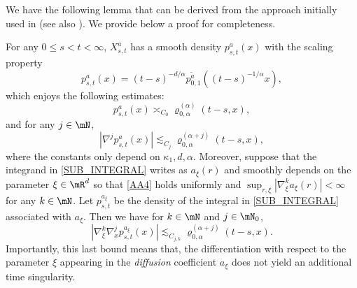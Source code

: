 We have the following lemma that can be derived from the approach initially used in \cite{Be} (see also
\cite{Bo-Ja}).
We provide below a proof for completeness.
\begin{lemma}\label{Le27}
For any $0\leq s<t<\infty$, $X^a_{s,t}$ has a smooth density $p_{s,t}^{a}(x)$ with the scaling property
\begin{equation}\label{SC0}
p_{s,t}^{a}(x)=(t-s)^{-d/\alpha} p_{0,1}^{\tilde a}((t-s)^{-1/\alpha}x),
\end{equation}
which enjoys the following estimates:
\begin{equation}
p_{s,t}^{a}(x)\asymp_{C_0}\varrho^{(\alpha)}_{0,\alpha}(t-s,x),\label{Es0}
\end{equation}
and for any $j\in\mN$,
\begin{equation}
|\nabla^j p_{s,t}^{a}(x)|\lesssim_{C_j}\varrho^{(\alpha+j)}_{0,\alpha}(t-s,x),\label{Es2}
\end{equation}
where the constants only depend on $\kappa_1,d,\alpha$. Moreover, suppose that the integrand in \eqref{SUB_INTEGRAL} writes as $a_\xi(r)$ and smoothly depends on the parameter $\xi\in\mR^d$ so that \eqref{AA4} holds uniformly and
$\sup_{r,\xi}|\nabla^k_\xi a_\xi(r)|<\infty$ for any $k\in\mN$.
Let $p_{s,t}^{a_\xi}$ be the density of the integral in \eqref{SUB_INTEGRAL} associated with $a_\xi$. Then we have
for $k\in\mN$ and $j\in\mN_0$,
\begin{equation}
|\nabla^k_\xi\nabla^j_x p_{s,t}^{a_\xi}(x)|\lesssim_{C_{j,k}} \varrho^{(\alpha+j)}_{0,\alpha}(t-s,x).\label{Es22}
\end{equation}
Importantly, this last bound means that, the differentiation with respect to the parameter $\xi $ appearing in the \textit{diffusion} coefficient $a_\xi$ does not yield an additional time singularity.
\end{lemma}
